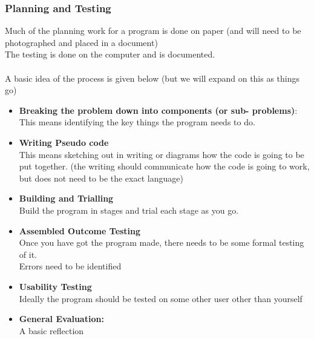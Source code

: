 \documentclass[a4paper,12pt]{article}
\begin{document}
\subsubsection{Planning and Testing}
Much of the planning work for a program is done on paper (and will need to be photographed and placed in a document)\\
The testing is done on the computer and is documented.\\\\
A basic idea of the process is given below (but we will expand on this as things go)
\begin{itemize}
	\item \textbf{Breaking the problem down into components (or sub- problems)}:\\
	This means identifying the key things the program needs to do.

\item \textbf{Writing Pseudo code}\\
This means sketching out in writing or diagrams how the code is going to be put together. (the writing should communicate how the code is going to work, but does not need to be the exact language) 
\item \textbf{Building and Trialling}\\
Build the program in stages and trial each stage as you go.
\item \textbf{Assembled Outcome Testing}\\
Once you have got the program made, there needs to be some formal testing of it. \\
Errors need to be identified 
\item \textbf{Usability Testing}\\
Ideally the program should be tested on some other user other than yourself
\item \textbf{General Evaluation:}\\
A basic reflection
\end{itemize}
\end{document}
